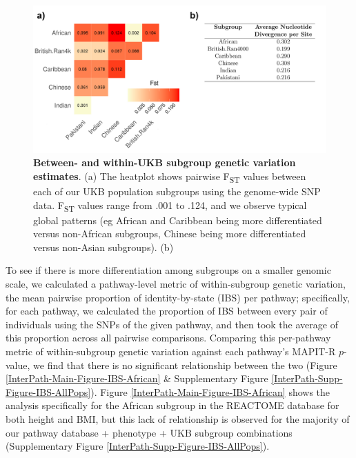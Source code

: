 \documentclass[12pt,a4paper]{article}
\begin{document}
\begin{figure}[htb]
\centering
\hspace*{-2cm}
\includegraphics[scale=.5]{Images/Main/InterPath_Main_Figure_Fst_vs3.png}
\caption[TBD]{\textbf{Between- and within-UKB subgroup genetic variation estimates}. (a) The heatplot shows pairwise F\textsubscript{ST} values between each of our UKB population subgroups using the genome-wide SNP data. F\textsubscript{ST} values range from .001 to .124, and we observe typical global patterns (eg African and Caribbean being more differentiated versus non-African subgroups, Chinese being more differentiated versus non-Asian subgroups). (b) }
\label{InterPath-Main-Figure-Fst}
\end{figure}


To see if there is more differentiation among subgroups on a smaller genomic scale, we calculated a pathway-level metric of within-subgroup genetic variation, the mean pairwise proportion of identity-by-state (IBS) per pathway; specifically, for each pathway, we calculated the proportion of IBS between every pair of individuals using the SNPs of the given pathway, and then took the average of this proportion across all pairwise comparisons.  Comparing this per-pathway metric of within-subgroup genetic variation against each pathway's MAPIT-R $p$-value, we find that there is no significant relationship between the two (Figure \ref{InterPath-Main-Figure-IBS-African} \& Supplementary Figure \ref{InterPath-Supp-Figure-IBS-AllPops}). Figure \ref{InterPath-Main-Figure-IBS-African} shows the analysis specifically for the African subgroup in the REACTOME database for both height and BMI, but this lack of relationship is observed for the majority of our pathway database + phenotype + UKB subgroup combinations (Supplementary Figure \ref{InterPath-Supp-Figure-IBS-AllPops}). 
\end{document}
